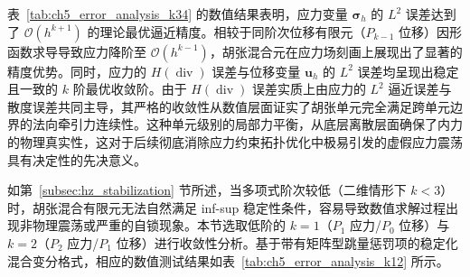 表~\ref{tab:ch5_error_analysis_k34} 的数值结果表明，应力变量 $\bm{\sigma}_h$ 的 $L^2$ 误差达到了 $\mathcal{O}(h^{k+1})$ 的理论最优逼近精度。相较于同阶次位移有限元（$P_{k-1}$ 位移）因形函数求导导致应力降阶至 $\mathcal{O}(h^{k-1})$，胡张混合元在应力场刻画上展现出了显著的精度优势。同时，应力的 $H(\operatorname{div})$ 误差与位移变量 $\boldsymbol{u}_h$ 的 $L^2$ 误差均呈现出稳定且一致的 $k$ 阶最优收敛阶。由于 $H(\operatorname{div})$ 误差实质上由应力的 $L^2$ 逼近误差与散度误差共同主导，其严格的收敛性从数值层面证实了胡张单元完全满足跨单元边界的法向牵引力连续性。这种单元级别的局部力平衡，从底层离散层面确保了内力的物理真实性，这对于后续彻底消除应力约束拓扑优化中极易引发的虚假应力震荡具有决定性的先决意义。

如第~\ref{subsec:hz_stabilization} 节所述，当多项式阶次较低（二维情形下 $k < 3$）时，胡张混合有限元无法自然满足 inf-sup 稳定性条件，容易导致数值求解过程出现非物理震荡或严重的自锁现象。本节选取低阶的 $k=1$（$P_1$ 应力/$P_0$ 位移）与 $k=2$（$P_2$ 应力/$P_1$ 位移）进行收敛性分析。基于带有矩阵型跳量惩罚项的稳定化混合变分格式，相应的数值测试结果如表~\ref{tab:ch5_error_analysis_k12} 所示。

